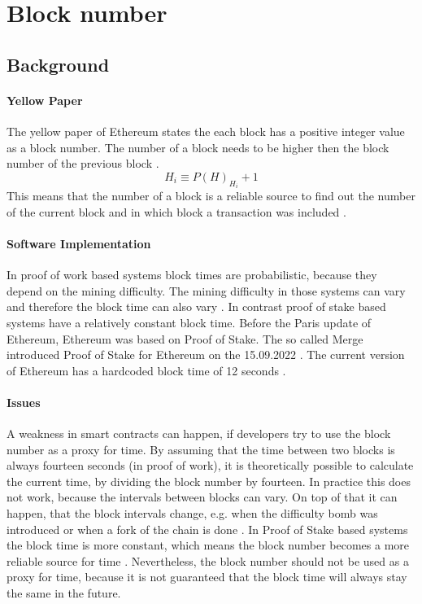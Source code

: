 \section{Block number}

\subsection{Background}

\paragraph{Yellow Paper}
The yellow paper of Ethereum states the each block has a positive integer value as a block number.
The number of a block needs to be higher then the block number of the previous block \cite{ethyellowpaper2023}.
\begin{equation} \label{eq:blocknumber}
    H_i \equiv P(H)_{H_i} + 1
\end{equation}
This means that the number of a block is a reliable source to find out 
the number of the current block and in which block a transaction was included \cite{eth_blocks}.

\paragraph{Software Implementation}
In proof of work based systems block times are probabilistic, because they depend on the mining difficulty.
The mining difficulty in those systems can vary and therefore the block time can also vary \cite{eth_blocks}. \newline
In contrast proof of stake based systems have a relatively constant block time.
Before the Paris update of Ethereum, Ethereum was based on Proof of Stake. The so called Merge introduced Proof of Stake for Ethereum
on the 15.09.2022 \cite{eth_history}. The current version of Ethereum has a hardcoded block time of 12 seconds \cite{eth_blocks}. \newline

\paragraph{Issues}
A weakness in smart contracts can happen, if developers try to use the block number as a proxy for time.
By assuming that the time between two blocks is always fourteen seconds (in proof of work), it is theoretically possible to
calculate the current time, by dividing the block number by fourteen. In practice this does not work,
because the intervals between blocks can vary. On top of that it can happen, that the
block intervals change, e.g. when the difficulty bomb was introduced or when a fork of the chain is done \cite{swc116}. \newline
In Proof of Stake based systems the block time is more constant, which means the block number becomes a more reliable source for time \cite{bellatrix_specs}.
Nevertheless, the block number should not be used as a proxy for time, because it is not guaranteed that the block time will always stay the same in the future.	

